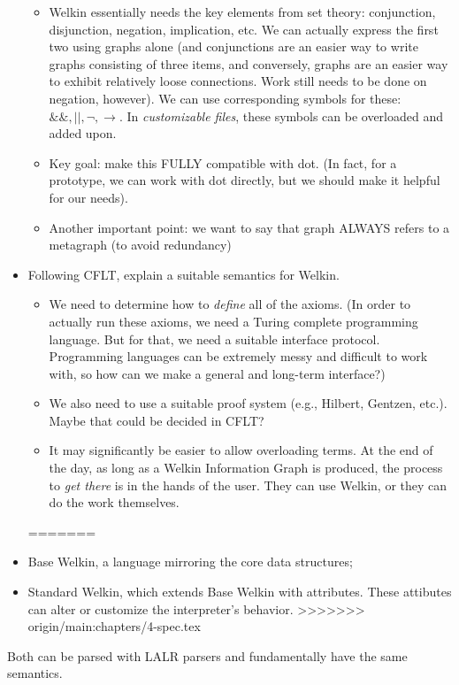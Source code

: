 \begin{itemize}
\begin{itemize}
			            \item Welkin essentially needs the key elements from set theory: conjunction, disjunction, negation, implication, etc. We can actually express the first two using graphs alone (and conjunctions are an easier way to write graphs consisting of three items, and conversely, graphs are an easier way to exhibit relatively loose connections. Work still needs to be done on negation, however). We can use corresponding symbols for these: $\&\&, ||, \neg, \rightarrow$. In \textit{customizable files}, these symbols can be overloaded and added upon.
			            \item Key goal: make this FULLY compatible with dot. (In fact, for a prototype, we can work with dot directly, but we should make it helpful for our needs).
									\item Another important point: we want to say that graph ALWAYS refers to a metagraph (to avoid redundancy)		            \end{itemize}
	\item Following CFLT, explain a suitable semantics for Welkin.
	      \begin{itemize}
		      \item We need to determine how to \textit{define} all of the axioms. (In order to actually run these axioms, we need a Turing complete programming language. But for that, we need a suitable interface protocol. Programming languages can be extremely messy and difficult to work with, so how can we make a general and long-term interface?)
			\item We also need to use a suitable proof system (e.g., Hilbert, Gentzen, etc.). Maybe that could be decided in CFLT?
			\item It may significantly be easier to allow overloading terms. At the end of the day, as long as a Welkin Information Graph is produced, the process to \textit{get there} is in the hands of the user. They can use Welkin, or they can do the work themselves.
	      \end{itemize}
=======
	\item Base Welkin, a language mirroring the core data structures;
	\item Standard Welkin, which extends Base Welkin with attributes. These attibutes can alter or customize the interpreter's behavior.
>>>>>>> origin/main:chapters/4-spec.tex
\end{itemize}
Both can be parsed with LALR parsers and fundamentally have the same semantics.

